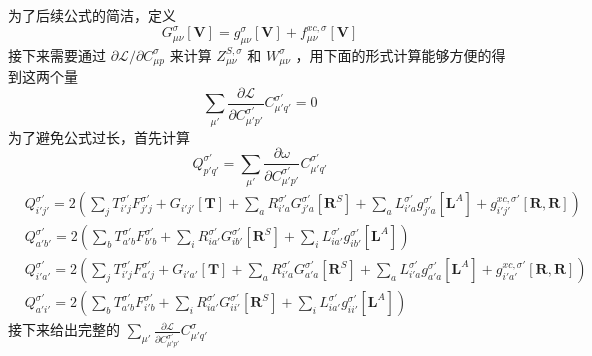 \documentclass[11pt]{ctexart}
\numberwithin{equation}{section}
\begin{document}
为了后续公式的简洁，定义
\begin{equation}
    G_{\mu\nu}^{\sigma}[\mathbf{V}] = g_{\mu\nu}^{\sigma}[\mathbf{V}] + f_{\mu\nu}^{xc,\sigma}[\mathbf{V}]
\end{equation}
接下来需要通过 $\partial\mathcal{L}/\partial C_{\mu p}^{\sigma}$ 来计算 $Z_{\mu\nu}^{S,\sigma}$ 和 $W_{\mu\nu}^{\sigma}$ ，用下面的形式计算能够方便的得到这两个量
\begin{equation}
    \sum_{\mu'}\frac{\partial\mathcal{L}}{\partial C_{\mu' p'}^{\sigma'}}C_{\mu' q'}^{\sigma'} = 0
\end{equation}
为了避免公式过长，首先计算
\begin{equation}
    Q_{p'q'}^{\sigma'} = \sum_{\mu'}\frac{\partial\omega}{\partial C_{\mu' p'}^{\sigma'}}C_{\mu' q'}^{\sigma'}
\end{equation}
\begin{equation}
    \begin{aligned}
        & Q_{i'j'}^{\sigma'} = 2\left(
            \sum_{j}T_{i' j}^{\sigma'}F_{j' j}^{\sigma'}
            + G_{i' j'}[\mathbf{T}]
            + \sum_{a}R_{i' a}^{\sigma'}G_{j' a}^{\sigma'}[\mathbf{R}^{S}]
            + \sum_{a}L_{i' a}^{\sigma'}g_{j' a}^{\sigma'}[\mathbf{L}^{A}]
            + g_{i' j'}^{xc,\sigma'}[\mathbf{R}, \mathbf{R}]
        \right)\\
        & Q_{a'b'}^{\sigma'} = 2\left(
            \sum_{b}T_{a' b}^{\sigma'}F_{b'b}^{\sigma'}
            + \sum_{i}R_{i a'}^{\sigma'}G_{i b'}^{\sigma'}[\mathbf{R}^{S}]
            + \sum_{i}L_{i a'}^{\sigma'}g_{i b'}^{\sigma'}[\mathbf{L}^{A}]
        \right)\\
        & Q_{i'a'}^{\sigma'} = 2\left(
            \sum_{j}T_{i' j}^{\sigma'}F_{a' j}^{\sigma'}
            + G_{i' a'}[\mathbf{T}]
            + \sum_{a}R_{i' a}^{\sigma'}G_{a' a}^{\sigma'}[\mathbf{R}^{S}]
            + \sum_{a}L_{i' a}^{\sigma'}g_{a' a}^{\sigma'}[\mathbf{L}^{A}]
            + g_{i' a'}^{xc,\sigma'}[\mathbf{R}, \mathbf{R}]
        \right)\\
        & Q_{a'i'}^{\sigma'} = 2\left(
            \sum_{b}T_{a' b}^{\sigma'}F_{i' b}^{\sigma'}
            + \sum_{i}R_{i a'}^{\sigma'}G_{i i'}^{\sigma'}[\mathbf{R}^{S}]
            + \sum_{i}L_{i a'}^{\sigma'}g_{i i'}^{\sigma'}[\mathbf{L}^{A}]
        \right)
    \end{aligned}
\end{equation}
接下来给出完整的 $\sum_{\mu'}\frac{\partial\mathcal{L}}{\partial C_{\mu'p'}^{\sigma'}} C_{\mu'q'}^{\sigma}$
\end{document}

